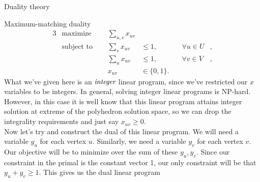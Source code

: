 \begin{section}{Duality theory}
\begin{subsection}{Maximum-matching duality}
	\begin{alignat}{3}
		& \text{maximize } & \sum_{u,v} x_{uv}& \\
		& \text{subject to } \quad & \sum_{v} x_{uv} & \leq 1, & \quad \forall u\in U&, \\
				     &\quad & \sum_{u} x_{uv} & \leq 1, & \quad \forall v\in V &, \\
				&& x_{uv} & \in \{0,1\}.
	\end{alignat}
	What we've given here is an $\emph{integer}$ linear program, since we've restricted our 
	$x$ variables to be integers. In general, solving integer linear programs is NP-hard. However, 
	in this case it is well know that this linear program attains integer solution at extreme 
	of the polyhedron solution space, so we can drop the integrality requirements and just say 
	$x_{uv} \geq 0$.\\
	Now let's try and construct the dual of this linear program. We will need a variable 
	$y_u$ for each vertex $u$. Similarly, we need a variable $y_v$ for each vertex $v$. Our 
	objective will be to minimize over the sum of these $y_u,y_v$. Since our constraint 
	in the primal is the constant vector 1, our only constraint will be that $y_u + y_v \geq 1$. 
	This gives us the dual linear program


\end{subsection}
\end{section}
